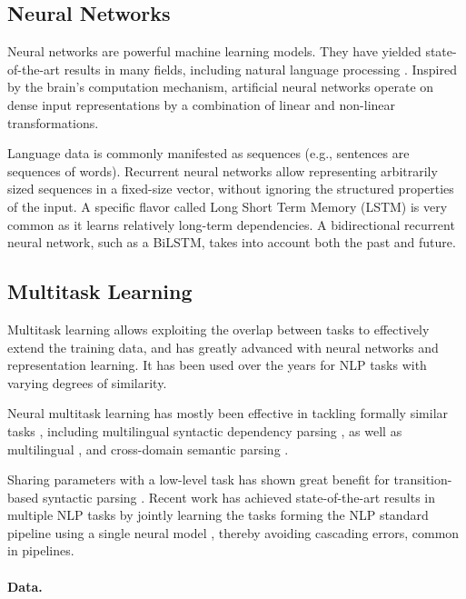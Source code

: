 \documentclass[12pt]{report}
\begin{document}
\subsection*{Neural Networks}

Neural networks are powerful machine learning models.
They have yielded state-of-the-art results in many fields,
including natural language processing \citep{goldberg2016primer}.
Inspired by the brain's computation mechanism,
artificial neural networks operate on dense input representations
by a combination of linear and non-linear transformations.

Language data is commonly manifested as sequences
(e.g., sentences are sequences of words).
Recurrent neural networks \citep{elman1990finding} allow representing
arbitrarily sized sequences in a fixed-size vector,
without ignoring the structured properties of the input.
A specific flavor called Long Short Term Memory
(LSTM) is very common as it learns relatively long-term dependencies.
A bidirectional recurrent neural network, such as a BiLSTM,
takes into account both the past and future.


\subsection*{Multitask Learning}

Multitask learning \citep{caruana1998multitask} allows exploiting the overlap between tasks
to effectively extend the training data, 
and has greatly advanced with neural networks and representation learning.
It has been used over the years for NLP tasks with varying degrees of similarity.

Neural multitask learning has mostly been effective in tackling formally similar
tasks \citep{P16-2038},
including
multilingual syntactic dependency parsing \citep{Q16-1031,guo2016exploiting},
as well as multilingual \citep{duong2017multilingual},
and cross-domain semantic parsing \citep{herzig-berant:2017:Short,W17-2607}.

Sharing parameters with a low-level task
has shown great benefit for transition-based syntactic parsing
\citep{bohnet2012transition,Zhang2016StackpropagationIR,constant-nivre:2016:P16-1,more2016joint}.
Recent work has achieved state-of-the-art results in multiple NLP tasks
by jointly learning the tasks forming the NLP standard pipeline using 
a single neural model \citep{collobert2011natural,D17-1206},
thereby avoiding cascading errors, common in pipelines.

\paragraph{Data.}
\end{document}
